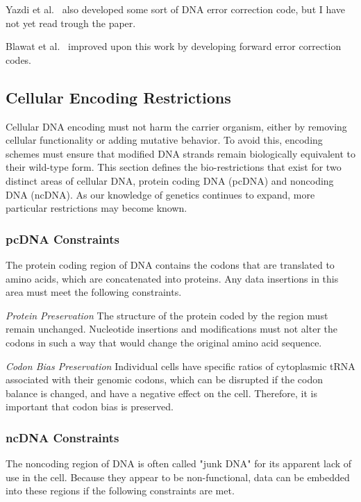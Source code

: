 \documentclass[USenglish,oneside,twocolumn]{article}
\begin{document}
Yazdi et al.~\cite{YAZDI2015} also developed some sort of DNA error correction code, but I have not yet read trough the paper.

Blawat et al.~\cite{BLAWAT2016} improved upon this work by developing forward error correction codes.

\subsection{Cellular Encoding Restrictions}

Cellular DNA encoding must not harm the carrier organism, either by removing cellular functionality or adding mutative behavior. To avoid this, encoding schemes must ensure that modified DNA strands remain biologically equivalent to their wild-type form. This section defines the bio-restrictions that exist for two distinct areas of cellular DNA, protein coding DNA (pcDNA) and noncoding DNA (ncDNA). As our knowledge of genetics continues to expand, more particular restrictions may become known.

\subsubsection{pcDNA Constraints}

The protein coding region of DNA contains the codons that are translated to amino acids, which are concatenated into proteins. Any data insertions in this area must meet the following constraints.

\textit{Protein Preservation} The structure of the protein coded by the region must remain unchanged. Nucleotide insertions and modifications must not alter the codons in such a way that would change the original amino acid sequence.

\textit{Codon Bias Preservation} Individual cells have specific ratios of cytoplasmic tRNA associated with their genomic codons, which can be disrupted if the codon balance is changed, and have a negative effect on the cell. Therefore, it is important that codon bias is preserved.


\subsubsection{ncDNA Constraints}

The noncoding region of DNA is often called "junk DNA" for its apparent lack of use in the cell. Because they appear to be non-functional, data can be embedded into these regions if the following constraints are met.
\end{document}
